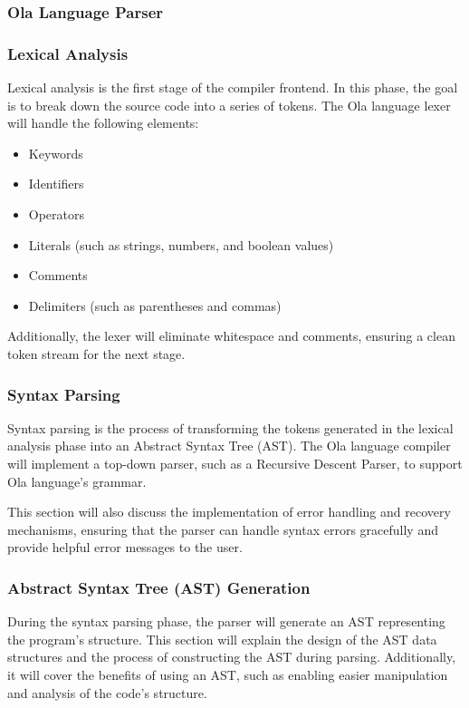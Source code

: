 
\subsubsection{Ola Language Parser}
\subsubsection*{Lexical Analysis}
Lexical analysis is the first stage of the compiler frontend. In this phase, the goal is to break down the source code into a series of tokens. The Ola language lexer will handle the following elements:
\begin{itemize}
\item Keywords
\item Identifiers
\item Operators
\item Literals (such as strings, numbers, and boolean values)
\item Comments
\item Delimiters (such as parentheses and commas)
\end{itemize}
Additionally, the lexer will eliminate whitespace and comments, ensuring a clean token stream for the next stage.

\subsubsection*{Syntax Parsing}
Syntax parsing is the process of transforming the tokens generated in the lexical analysis phase into an Abstract Syntax Tree (AST). The Ola language compiler will implement a top-down parser, such as a Recursive Descent Parser, to support Ola language's grammar.

This section will also discuss the implementation of error handling and recovery mechanisms, ensuring that the parser can handle syntax errors gracefully and provide helpful error messages to the user.

\subsubsection*{Abstract Syntax Tree (AST) Generation}
During the syntax parsing phase, the parser will generate an AST representing the program's structure. This section will explain the design of the AST data structures and the process of constructing the AST during parsing. Additionally, it will cover the benefits of using an AST, such as enabling easier manipulation and analysis of the code's structure.

